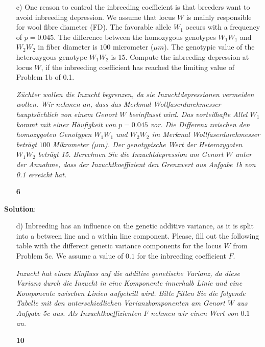\documentclass[
]{article}
\newcommand{\points}[1]
{\begin{flushright}\textbf{#1}\end{flushright}}
\newcommand{\solstart}
{\vspace{3ex}\textbf{Solution}:}
\begin{document}
\begin{enumerate}
\item[c)] One reason to control the inbreeding coefficient is that breeders want to avoid inbreeding depression. We assume that locus $W$ is mainly responsible for wool fibre diameter (FD). The favorable allele $W_1$ occurs with a frequency of $p = 0.045$. The difference between the homozygous genotypes $W_1W_1$ and $W_2W_2$ in fiber diameter is $100$ micrometer ($\mu m$). The genotypic value of the heterozygous genotype $W_1W_2$ is 15. Compute the inbreeding depression at locus $W$, if the inbreeding coefficient has reached the limiting value of Problem 1b of 0.1.

\textit{Züchter wollen die Inzucht begrenzen, da sie Inzuchtdepressionen vermeiden wollen. Wir nehmen an, dass das Merkmal Wollfaserdurchmesser hauptsächlich von einem Genort $W$ beeinflusst wird. Das vorteilhafte Allel $W_1$ kommt mit einer Häufigkeit von $p = 0.045$ vor. Die Differenz zwischen den homozygoten Genotypen $W_1W_1$ und $W_2W_2$ im Merkmal Wollfaserdurchmesser beträgt $100$ Mikrometer ($\mu m$). Der genotypische Wert der Heterozygoten $W_1W_2$ beträgt 15. Berechnen Sie die Inzuchtdepression am Genort $W$ unter der Annahme, dass der Inzuchtkoeffizient den Grenzwert aus Aufgabe 1b von 0.1 erreicht hat.}
\points{6}
\end{enumerate}

\vspace{3ex}
\solstart

\clearpage
\pagebreak

\begin{enumerate}
\item[d)] Inbreeding has an influence on the genetic additive variance, as it is split into a between line and a within line component. Please, fill out the following table with the different genetic variance components for the locus $W$ from Problem 5c. We assume a value of  $0.1$ for the inbreeding coefficient $F$. 

\textit{Inzucht hat einen Einfluss auf die additive genetische Varianz, da diese Varianz durch die Inzucht in eine Komponente innerhalb Linie und eine Komponente zwischen Linien aufgeteilt wird. Bitte füllen Sie die folgende Tabelle mit den unterschiedlichen Varianzkomponenten am Genort $W$ aus Aufgabe 5c aus. Als Inzuchtkoeffizienten $F$ nehmen wir einen Wert von $0.1$ an.}
\points{10}
\end{enumerate}

\vspace{3ex}
\end{document}
